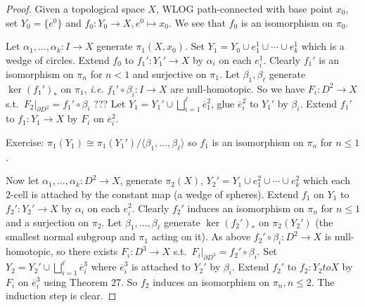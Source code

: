 \documentclass[12pt,class=article,crop=false]{standalone}
\begin{document}
\begin{proof}
Given a topological space $ X$, WLOG path-connected with base point $ x_0$,  set $ Y_0 = \{e^{0}\} $ and $ f_0: Y_0 \to X, e^{0} \mapsto x_0$. We see that $ f_0$ is an isomorphism on $ \pi_0$.

Let $ \alpha_1,\ldots, \alpha_k: I \to X$ generate $ \pi_1(X,x_0)$. Set $ Y_1 = Y_0 \cup e_1^{1} \cup \cdots \cup e_k^{1}$ which is a wedge of circles. Extend $ f_0$ to $ f_1': Y_1' \to X$ by $ \alpha_i$ on each $ e_i^{1}$. Clearly $ f_1'$ is an isomorphism on $ \pi_n$ for $ n<1$ and surjective on  $ \pi_1$. Let $ \beta_1, \beta_\ell$ generate $ \ker (f_1')_*$ on $ \pi_1$, \emph{i.e.} $ f_1' \circ \beta_i: I \to X$ are null-homotopic. So we have $ F_i: D^2 \to X$ s.t.\ $ F_2|_{ \partial D^2} = f_1' \circ \beta_i$ ??? Let $ Y_1 = Y_1' \cup \bigsqcup_{ i=1}^{\ell} \overline{e}_1^2$, glue $ \overline{e}_i^2$ to $ Y_1'$ by $ \beta_i$. Extend $ f_1'$ to $ f_1: Y_1 \to X$ by $ F_i$ on $ \overline{e}_i^2$.

Exercise: $ \pi_1(Y_1) \cong \pi_1(Y_1') / \langle \beta_1, \ldots, \beta_\ell \rangle$ so $ f_1 $ is an isomorphism on $ \pi_n$ for $ n \leq 1$.

Now let  $ \alpha_1,\ldots, \alpha_k: D^2 \to X$, generate $ \pi_2(X)$, $ Y_2' = Y_1 \cup  e_1^2 \cup \cdots \cup e_k^2$ which each 2-cell is attached by the constant map (a wedge of spheres). Extend $ f_1$ on $ Y_1$ to $ f_2': Y_2' \to X$ by $ \alpha_i$ on each $ e_i^2$. Clearly $ f_2'$ induces an isomorphism on $ \pi_n$ for $ n\leq 1$ and a surjection on  $ \pi_2$. Let $ \beta_1,\ldots, \beta_\ell$ generate $ \ker( f_2')_*$ on $ \pi_2(Y_2')$ (the smallest normal subgroup and $ \pi_1$ acting on it). As above $ f_2' \circ  \beta_i: D^2 \to X$ is null-homotopic, so there exists $ F_i: D^3 \to X$ s.t.\ $ F_i|_{ \partial D^3} = f_2' \circ \beta_i$. Set $ Y_2 = Y_2' \cup \bigsqcup_{ i=1}^{\ell} \overline{e}_i^3$ where $ \overline{e}_i^3$ is attached to $ Y_2'$ by $ \beta_i$. Extend $ f_2'$ to $ f_2: Y_2 to X$ by $ F_i$ on $ \overline{e}_i^3$ using Theorem 27. So $ f_2$ induces an isomorphism on $ \pi_n, n \leq 2$. The induction step is clear.
\end{proof}
\end{document}
